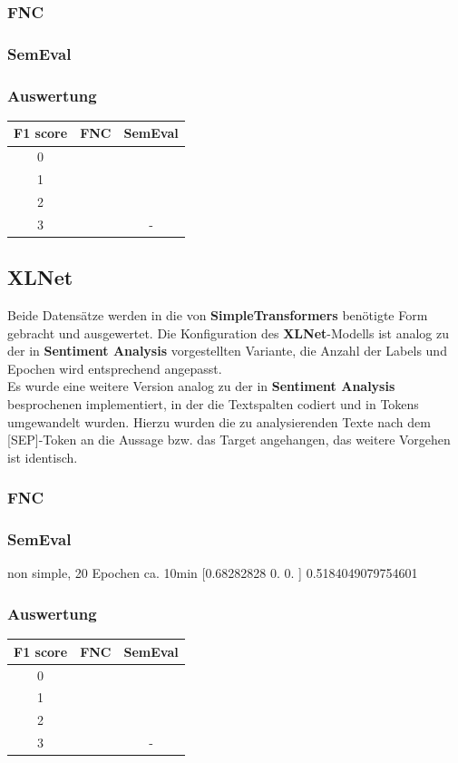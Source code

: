 \subsubsection*{FNC}

\subsubsection*{SemEval}

\subsubsection*{Auswertung}
\begin{center}
\begin{tabular}{|c||c|c|}
\hline
F1 score & FNC & SemEval\\ 
\hline\hline
0 &  & \\
\hline
1 &  & \\ 
\hline
2 &  & \\
\hline
3 &  & -\\
\hline    
\end{tabular}
\end{center}

\subsection{XLNet}
Beide Datens\"atze werden in die von \textbf{SimpleTransformers} ben\"otigte Form gebracht und ausgewertet. Die Konfiguration des \textbf{XLNet}-Modells ist analog zu der in \textbf{Sentiment Analysis} vorgestellten Variante, die Anzahl der Labels und Epochen wird entsprechend angepasst.\\
Es wurde eine weitere Version analog zu der in \textbf{Sentiment Analysis} besprochenen implementiert, in der die Textspalten codiert und in Tokens umgewandelt wurden. Hierzu wurden die zu analysierenden Texte nach dem [SEP]-Token an die Aussage bzw. das Target angehangen, das weitere Vorgehen ist identisch.

\subsubsection*{FNC}

\subsubsection*{SemEval}
non simple, 20 Epochen ca. 10min
[0.68282828 0.         0.        ]
0.5184049079754601


\subsubsection*{Auswertung}
\begin{center}
\begin{tabular}{|c||c|c|}
\hline
F1 score & FNC & SemEval\\ 
\hline\hline
0 &  & \\
\hline
1 &  & \\ 
\hline
2 &  & \\
\hline
3 &  & -\\
\hline    
\end{tabular}
\end{center}
